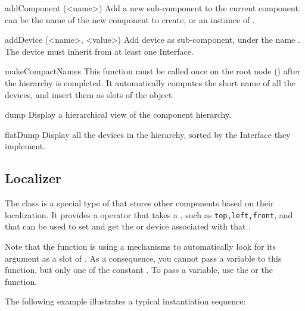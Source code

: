 \begin{urbiscriptapi}

\item[addComponent](<name>)%
  Add a new sub-component to the current component.  can
  be the name of the new component to create, or an instance of
  .

\item[addDevice](<name>, <value>)%
  Add device  as sub-component, under the name . The
  device must inherit from at least one Interface.

\item[makeCompactNames]%
  This function must be called once on the root node ()
  after the hierarchy is completed.  It automatically computes the
  short name of all the devices, and insert them as slots of the
   object.

\item[dump]%
  Display a hierarchical view of the component hierarchy.

\item[flatDump]%
  Display all the devices in the hierarchy, sorted by the Interface
  they implement.
\end{urbiscriptapi}

\subsection{Localizer}

The  class is a special type of  that stores
other components based on their localization. It provides a \code{[]} operator
that takes a , such as \lstinline|top,left,front|, and that
can be used to set and get the  or device associated with
that .

Note that the \code{[]} function is using a mechanisms to automatically look
for its argument as a slot of . As a consequence, you cannot
pass a variable to this function, but only one of the constant
.
To pass a variable, use the  or the 
function.

The following example illustrates a typical instantiation sequence:

